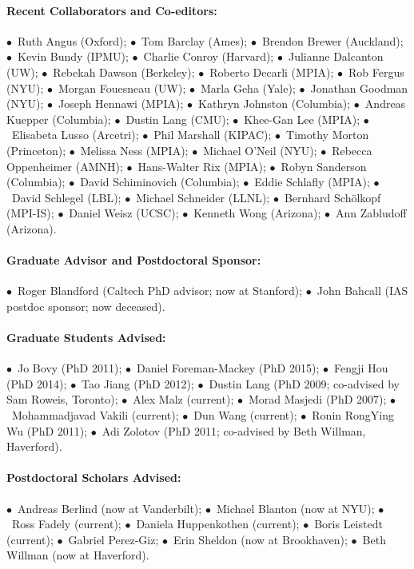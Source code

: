 \documentclass[letterpaper,12pt]{article}
\begin{document}
\paragraph{Recent Collaborators and Co-editors:}
$\bullet$~Ruth Angus (Oxford);
$\bullet$~Tom Barclay (Ames);
$\bullet$~Brendon Brewer (Auckland);
$\bullet$~Kevin Bundy (IPMU);
$\bullet$~Charlie Conroy (Harvard);
$\bullet$~Julianne Dalcanton (UW);
$\bullet$~Rebekah Dawson (Berkeley);
$\bullet$~Roberto Decarli (MPIA);
$\bullet$~Rob Fergus (NYU);
$\bullet$~Morgan Fouesneau (UW);
$\bullet$~Marla Geha (Yale);
$\bullet$~Jonathan Goodman (NYU);
$\bullet$~Joseph Hennawi (MPIA);
$\bullet$~Kathryn Johnston (Columbia);
$\bullet$~Andreas Kuepper (Columbia);
$\bullet$~Dustin Lang (CMU);
$\bullet$~Khee-Gan Lee (MPIA);
$\bullet$~Elisabeta Lusso (Arcetri);
$\bullet$~Phil Marshall (KIPAC);
$\bullet$~Timothy Morton (Princeton);
$\bullet$~Melissa Ness (MPIA);
$\bullet$~Michael O'Neil (NYU);
$\bullet$~Rebecca Oppenheimer (AMNH);
$\bullet$~Hans-Walter Rix (MPIA);
$\bullet$~Robyn Sanderson (Columbia);
$\bullet$~David Schiminovich (Columbia);
$\bullet$~Eddie Schlafly (MPIA);
$\bullet$~David Schlegel (LBL);
$\bullet$~Michael Schneider (LLNL);
$\bullet$~Bernhard Sch\"olkopf (MPI-IS);
$\bullet$~Daniel Weisz (UCSC);
$\bullet$~Kenneth Wong (Arizona);
$\bullet$~Ann Zabludoff (Arizona).

\paragraph{Graduate Advisor and Postdoctoral Sponsor:}
$\bullet$~Roger Blandford (Caltech PhD advisor; now at Stanford);
$\bullet$~John Bahcall (IAS postdoc sponsor; now deceased).

\paragraph{Graduate Students Advised:}
$\bullet$~Jo Bovy (PhD 2011);
$\bullet$~Daniel Foreman-Mackey (PhD 2015);
$\bullet$~Fengji Hou (PhD 2014);
$\bullet$~Tao Jiang (PhD 2012);
$\bullet$~Dustin Lang (PhD 2009; co-advised by Sam Roweis, Toronto);
$\bullet$~Alex Malz (current);
$\bullet$~Morad Masjedi (PhD 2007);
$\bullet$~Mohammadjavad Vakili (current);
$\bullet$~Dun Wang (current);
$\bullet$~Ronin RongYing Wu (PhD 2011);
$\bullet$~Adi Zolotov (PhD 2011; co-advised by Beth Willman, Haverford).

\paragraph{Postdoctoral Scholars Advised:}
$\bullet$~Andreas Berlind (now at Vanderbilt);
$\bullet$~Michael Blanton (now at NYU);
$\bullet$~Ross Fadely (current);
$\bullet$~Daniela Huppenkothen (current);
$\bullet$~Boris Leistedt (current);
$\bullet$~Gabriel Perez-Giz;
$\bullet$~Erin Sheldon (now at Brookhaven);
$\bullet$~Beth Willman (now at Haverford).
\end{document}
